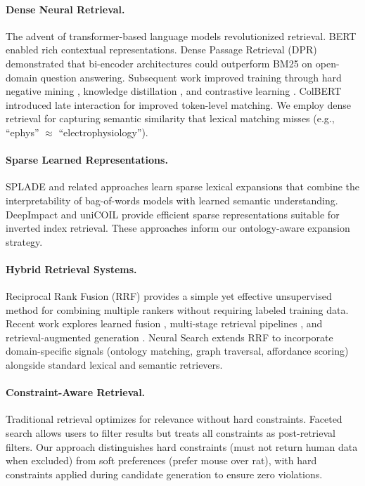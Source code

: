 \documentclass{article}
\theoremstyle{definition}
\begin{document}
\paragraph{Dense Neural Retrieval.} The advent of transformer-based language models revolutionized retrieval. BERT \citep{devlin2019bert} enabled rich contextual representations. Dense Passage Retrieval (DPR) \citep{karpukhin2020dense} demonstrated that bi-encoder architectures could outperform BM25 on open-domain question answering. Subsequent work improved training through hard negative mining \citep{xiong2020approximate}, knowledge distillation \citep{hofstatter2020improving}, and contrastive learning \citep{gao2021simcse}. ColBERT \citep{khattab2020colbert} introduced late interaction for improved token-level matching. We employ dense retrieval for capturing semantic similarity that lexical matching misses (e.g., ``ephys'' $\approx$ ``electrophysiology'').

\paragraph{Sparse Learned Representations.} SPLADE \citep{formal2021splade} and related approaches learn sparse lexical expansions that combine the interpretability of bag-of-words models with learned semantic understanding. DeepImpact \citep{mallia2021learning} and uniCOIL \citep{lin2021few} provide efficient sparse representations suitable for inverted index retrieval. These approaches inform our ontology-aware expansion strategy.

\paragraph{Hybrid Retrieval Systems.} Reciprocal Rank Fusion (RRF) \citep{cormack2009reciprocal} provides a simple yet effective unsupervised method for combining multiple rankers without requiring labeled training data. Recent work explores learned fusion \citep{chen2022hybrid}, multi-stage retrieval pipelines \citep{nogueira2019passage}, and retrieval-augmented generation \citep{lewis2020retrieval}. Neural Search extends RRF to incorporate domain-specific signals (ontology matching, graph traversal, affordance scoring) alongside standard lexical and semantic retrievers.

\paragraph{Constraint-Aware Retrieval.} Traditional retrieval optimizes for relevance without hard constraints. Faceted search \citep{hearst2006design} allows users to filter results but treats all constraints as post-retrieval filters. Our approach distinguishes hard constraints (must not return human data when excluded) from soft preferences (prefer mouse over rat), with hard constraints applied during candidate generation to ensure zero violations.
\end{document}
